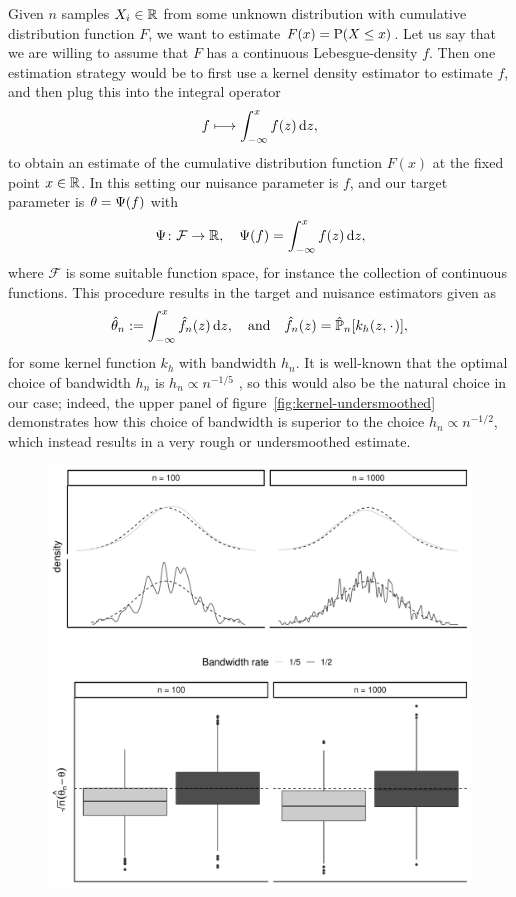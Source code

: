 \documentclass[a4,danish]{article}
\begin{document}
\begin{example}
  \label{example:kernel-int}
  Given $n$ samples $X_i \in \R$ from some unknown distribution with cumulative distribution
  function $F$, we want to estimate $F(x) = \P(X \leq x)$. Let us say that we are willing to assume
  that $F$ has a continuous Lebesgue-density $f$. Then one estimation strategy would be to first use
  a kernel density estimator to estimate $f$, and then plug this into the integral operator
  \begin{equation*}
    f \longmapsto \int_{-\infty}^x f(z) \diff z,
  \end{equation*}
  to obtain an estimate of the cumulative distribution function $F(x)$ at the fixed point
  $x \in \R$. In this setting our nuisance parameter is $f$, and our target parameter is
  $\theta = \TT(f)$ with
  \begin{equation*}
    \TT \colon \mathcal{F} \rightarrow \R, \quad \TT(f) = \int_{-\infty}^x f(z) \diff z,
  \end{equation*}
  where $\mathcal{F}$ is some suitable function space, for instance the collection of continuous
  functions. This procedure results in the target and nuisance estimators given as
  \begin{equation}
    \hat{\theta}_n := \int_{-\infty}^x \hat{f}_n(z)  \diff z,
    \quad \text{and} \quad
    \hat{f}_n(z) = \empmeas[k_h(z, \blank)],
  \end{equation}
  for some kernel function $k_h$ with bandwidth $h_n$. It is well-known that the optimal choice of
  bandwidth $h_n$ is $h_n \propto n^{-1/5}$ \citep{wasserman2006all}, so this would also be the
  natural choice in our case; indeed, the upper panel of figure~\ref{fig:kernel-undersmoothed}
  demonstrates how this choice of bandwidth is superior to the choice $h_n \propto n^{-1/2}$, which
  instead results in a very rough or undersmoothed estimate.
  \begin{figure}[h]
    \centerline{\includegraphics[width=.75\linewidth]{./figures/kernel-undersmooth-viz-presentation-3.pdf}}

\end{figure}
\end{example}
\end{document}
